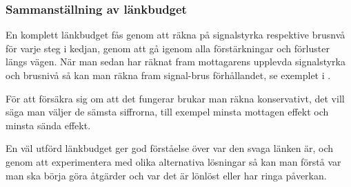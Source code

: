 \subsubsection{Sammanställning av länkbudget}

En komplett länkbudget fås genom att räkna på signalstyrka respektive brusnvå
för varje steg i kedjan, genom att gå igenom alla förstärkningar och förluster
längs vägen.
När man sedan har räknat fram mottagarens upplevda signalstyrka och brusnivå så
kan man räkna fram signal-brus förhållandet, se exemplet i .

För att försäkra sig om att det fungerar brukar man räkna konservativt, det
vill säga man väljer de sämsta siffrorna, till exempel minsta mottagen effekt
och minsta sända effekt.

En väl utförd länkbudget ger god förståelse över var den svaga länken är,
och genom att experimentera med olika alternativa lösningar så kan man
förstå var man ska börja göra åtgärder och var det är lönlöst eller har
ringa påverkan.
